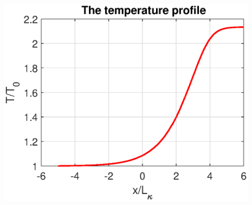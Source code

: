\documentclass{fancyslides}
\begin{document}
\begin{frame}
\begin{columns}
\begin{column}{0.5\textwidth}
\end{column}
\begin{column}{0.5\textwidth}  %
    \begin{center}
     \includegraphics[width=1.\textwidth]{1DTemp.eps}
     \end{center}
\end{column}
\end{columns}
\end{frame}
\end{document}
